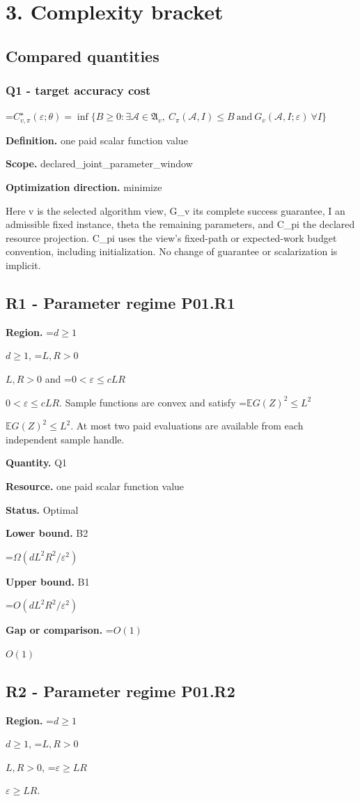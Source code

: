 \documentclass[10pt,a4paper]{article}
\newcommand{\AtlasMath}[1]{\par\begingroup\centering\setbox0=\hbox{$\displaystyle #1$}\ifdim\wd0>1.4\linewidth\typeout{ATLAS WIDE FORMULA: \the\wd0}\fi\ifdim\wd0>\linewidth\resizebox{\linewidth}{!}{\box0}\else\box0\fi\par\endgroup}
\newcommand{\AtlasInlineMath}[1]{\begingroup\setbox0=\hbox{$#1$}\ifdim\wd0>.4\linewidth\endgroup\AtlasMath{#1}\else\endgroup$#1$\fi}
\begin{document}
\section{3. Complexity bracket}
\subsection{Compared quantities}
\subsubsection{Q1 - target accuracy cost}
\AtlasMath{C^\star_{v,\pi}(\varepsilon;\theta)=\inf\{B\ge0:\exists\mathcal A\in\mathfrak A_v,\ C_\pi(\mathcal A,I)\le B\ \text{and}\ G_v(\mathcal A,I;\varepsilon)\ \forall I\}}
\textbf{Definition.} one paid scalar function value

\textbf{Scope.} declared\_joint\_parameter\_window

\textbf{Optimization direction.} minimize

Here v is the selected algorithm view, G\_v its complete success guarantee, I an admissible fixed instance, theta the remaining parameters, and C\_pi the declared resource projection. C\_pi uses the view's fixed-path or expected-work budget convention, including initialization. No change of guarantee or scalarization is implicit.

\subsection{R1 - Parameter regime P01.R1}
\textbf{Region.} \AtlasInlineMath{d\ge1}, \AtlasInlineMath{L,R>0} and \AtlasInlineMath{0<\varepsilon\le cLR}. Sample functions are convex and satisfy \AtlasInlineMath{\mathbb{E}G(Z)^2\le L^2}. At most two paid evaluations are available from each independent sample handle.

\textbf{Quantity.} Q1

\textbf{Resource.} one paid scalar function value

\textbf{Status.} Optimal

\textbf{Lower bound.} B2

\AtlasMath{\Omega(dL^2R^2/\varepsilon^2)}
\textbf{Upper bound.} B1

\AtlasMath{O(dL^2R^2/\varepsilon^2)}
\textbf{Gap or comparison.} \AtlasInlineMath{O(1)}

\subsection{R2 - Parameter regime P01.R2}
\textbf{Region.} \AtlasInlineMath{d\ge1}, \AtlasInlineMath{L,R>0}, \AtlasInlineMath{\varepsilon\ge LR}.
\end{document}

